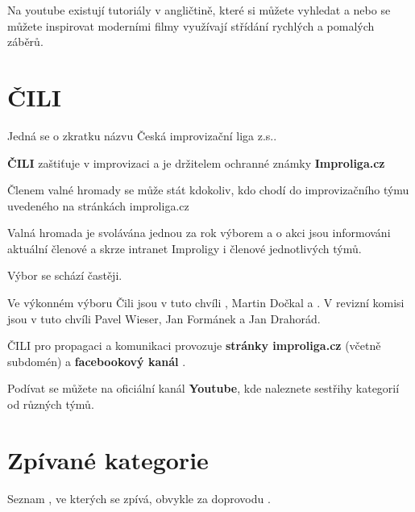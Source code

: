 \documentclass[main.tex]{subfiles}
\begin{document}
Na youtube existují tutoriály v angličtině, které si můžete vyhledat a nebo se můžete inspirovat moderními filmy využívají střídání rychlých a pomalých záběrů. 
 
\needspace{5cm} \section{ČILI} \label{čili} Jedná se o zkratku názvu Česká improvizační liga z.s..   
 
\textbf{ČILI}{} zaštiťuje  v improvizaci a je držitelem ochranné známky  \textbf{Improliga.cz}{} 
 
Členem valné hromady se může stát kdokoliv, kdo chodí do improvizačního týmu uvedeného na stránkách improliga.cz 
 
Valná hromada je svolávána jednou za rok výborem a o akci jsou informováni aktuální členové a skrze intranet Improligy i členové jednotlivých týmů. 
 
Výbor se schází častěji. 
 
Ve výkonném výboru  Čili jsou v tuto chvíli  , Martin Dočkal a . 
V revizní komisi jsou v tuto chvíli  Pavel Wieser, Jan Formánek a Jan Drahorád. 
 
ČILI pro propagaci a komunikaci provozuje \textbf{stránky improliga.cz} (včetně subdomén) a \textbf{facebookový kanál} . 
 
Podívat se můžete na oficiální kanál \textbf{Youtube}, kde naleznete sestřihy kategorií od různých týmů. 
\needspace{5cm} \section{Zpívané kategorie} \label{zpívané kategorie} \label{:kategorie:zpívané kategorie}Seznam , ve kterých se zpívá, obvykle za doprovodu . 
 
\end{document}
